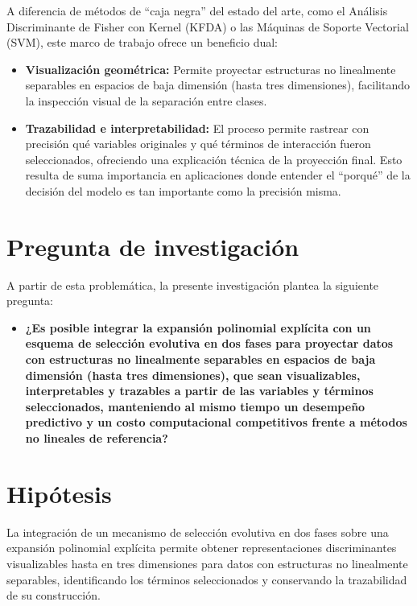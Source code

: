 A diferencia de métodos de ``caja negra'' del estado del arte, como el Análisis Discriminante de Fisher con Kernel (KFDA) o las Máquinas de Soporte Vectorial (SVM), este marco de trabajo ofrece un beneficio dual:

\begin{itemize}
	\item \textbf{Visualización geométrica:} Permite proyectar estructuras no linealmente separables en espacios de baja dimensión (hasta tres dimensiones), facilitando la inspección visual de la separación entre clases.
	
	\item \textbf{Trazabilidad e interpretabilidad:} El proceso permite rastrear con precisión qué variables originales y qué términos de interacción fueron seleccionados, ofreciendo una explicación técnica de la proyección final. Esto resulta de suma importancia en aplicaciones donde entender el ``porqué'' de la decisión del modelo es tan importante como la precisión misma.
\end{itemize}

\section{Pregunta de investigación}
\label{sec:Pregunta-Investigación}

A partir de esta problemática, la presente investigación plantea la siguiente pregunta:

\begin{itemize}
	\item \textbf{¿Es posible integrar la expansión polinomial explícita con un esquema de selección evolutiva en dos fases para proyectar datos con estructuras no linealmente separables en espacios de baja dimensión (hasta tres dimensiones), que sean visualizables, interpretables y trazables a partir de las variables y términos seleccionados, manteniendo al mismo tiempo un desempeño predictivo y un costo computacional competitivos frente a métodos no lineales de referencia?}
\end{itemize}

\section{Hipótesis}
\label{sec:Hipótesis}

La integración de un mecanismo de selección evolutiva en dos fases sobre una expansión polinomial explícita permite obtener representaciones discriminantes visualizables hasta en tres dimensiones para datos con estructuras no linealmente separables, identificando los términos seleccionados y conservando la trazabilidad de su construcción.

